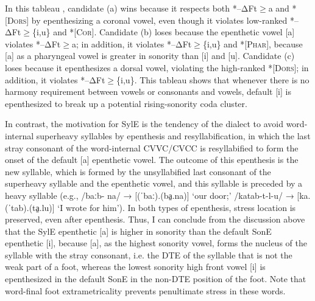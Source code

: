 \documentclass[output=paper,colorlinks,citecolor=brown]{langscibook}
\begin{document}
\noindent In this tableau , candidate (a) wins because it respects both *–ΔFt${\geq}$a and *[\textsc{Dors}] by epenthesizing a coronal vowel, even though it violates low-ranked *–ΔFt${\geq}$\{i,u\} and *[\textsc{Cor}]. Candidate (b) loses because   the epenthetic vowel [a] violates *–ΔFt${\geq}$a; in addition, it violates *–ΔFt${\geq}$\{i,u\} and *[\textsc{Phar}], because [a] as a pharyngeal vowel is greater in sonority than [i] and [u]. Candidate (c) loses because it epenthesizes a dorsal vowel, violating the high-ranked *[\textsc{Dors}]; in addition, it violates *–ΔFt${\geq}$\{i,u\}. This tableau shows that whenever there is no harmony requirement between vowels or consonants and vowels, default [i] is epenthesized to break up a potential rising-sonority coda cluster.

In contrast, the motivation for SylE is the tendency of the dialect to avoid word-internal superheavy syllables by epenthesis and    resyllabification, in which the last stray consonant of the word-internal CVVC/CVCC is resyllabified to form the onset of the default [a] epenthetic vowel. The outcome of this epenthesis   is the new syllable, which is formed by the unsyllabified last consonant of the superheavy syllable and the epenthetic vowel, and this syllable is preceded by a heavy syllable (e.g., /baːb{}- na/ → [(ˈbaː).(ba̠.na)] ‘our door;’ /katab{}-t-l-u/ → [ka.(ˈtab).(ta̠.lu)] ‘I wrote for him’). In both types of epenthesis, stress location is preserved, even after epenthesis. Thus, I can conclude from the discussion above that the SylE epenthetic [a] is higher in sonority than the default SonE epenthetic [i], because [a], as the highest  sonority vowel, forms the nucleus of the syllable with the stray consonant, i.e. the DTE of the syllable that is not the weak part of a foot, whereas the lowest sonority high front vowel [i] is epenthesized in the default SonE in the non-DTE position of the foot. Note that word-final foot extrametricality prevents penultimate stress in these words.
\end{document}
